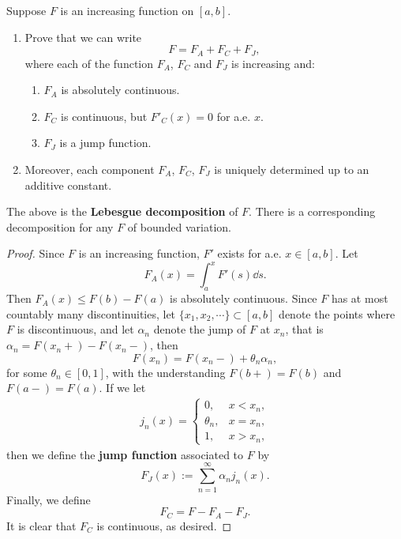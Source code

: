 \begin{example}
  \label{eg: Lebesgue decomposition of increasing function}
  Suppose $F$ is an increasing function on $[a,b]$.
  \begin{enumerate}
    \item Prove that we can write 
    \[
    F = F_A + F_C + F_J,
    \]
    where each of the function $F_A$, $F_C$ and $F_J$ is increasing and:
    \begin{enumerate}
      \item $F_A$ is absolutely continuous.
      \item $F_C$ is continuous, but $F'_C(x) = 0$ for a.e. $x$.
      \item $F_J$ is a jump function.
    \end{enumerate}
    \item Moreover, each component $F_A$, $F_C$, $F_J$ is uniquely determined up to an additive constant.
  \end{enumerate}
  The above is the \textbf{Lebesgue decomposition} of $F$. There is a corresponding decomposition for any $F$ of bounded variation.
\end{example}

\begin{proof}
  Since $F$ is an increasing function, $F'$ exists for a.e. $x \in [a, b]$.
  Let 
  \[
  F_A(x) = \int_a^xF'(s)\dd s.
  \]
  Then $F_A(x) \leq F(b) - F(a)$ is absolutely continuous.
  Since $F$ has at most countably many discontinuities, 
  let $\{x_1, x_2,\cdots\}\subset[a,b]$ denote the points where $F$ is discontinuous,
  and let $\alpha_n$ denote the jump of $F$ at $x_n$,
  that is $\alpha_n = F(x_n+) - F(x_n-)$,
  then  
  \[
  F(x_n) = F(x_n-) + \theta_n\alpha_n,
  \]
  for some $\theta_n\in[0,1]$,
  with the understanding $F(b+) = F(b)$ and $F(a-) = F(a)$.
  If we let 
  \begin{align*}
    j_n(x) = 
    \begin{cases}
      0, & x<x_n,\\
      \theta_n, & x=x_n,\\
      1, & x>x_n,
    \end{cases}
  \end{align*}
  then we define the \textbf{jump function} associated to $F$ by 
  \[
  F_J(x) := \sum_{n=1}^\infty \alpha_n j_n(x).
  \]
  Finally, we define 
  \[
  F_C = F - F_A - F_J.
  \]
  It is clear that $F_C$ is continuous, as desired.
\end{proof}

